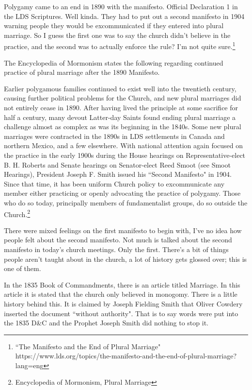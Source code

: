 Polygamy came to an end in 1890 with the manifesto. Official Declaration 1 in the
LDS Scriptures. Well kinda. They had to put out a second manifesto in 1904 warning
people they would be excommunicated if they entered into plural marriage. So I guess
the first one was to say the church didn't believe in the practice, and the second
was to actually enforce the rule? I'm not quite sure.\footnote{
``The Manifesto and the End of Plural Marriage"
https://www.lds.org/topics/the-manifesto-and-the-end-of-plural-marriage?lang=eng
}

The Encyclopedia of Mormonism states the following regarding continued practice of
plural marriage after the 1890 Manifesto.

\begin{displayquote}
Earlier polygamous families continued to exist well into the twentieth century,
causing further political problems for the Church, and new plural marriages did not
entirely cease in 1890. After having lived the principle at some sacrifice for half a
century, many devout Latter-day Saints found ending plural marriage a challenge
almost as complex as was its beginning in the 1840s. Some new plural marriages were
contracted in the 1890s in LDS settlements in Canada and northern Mexico, and a few
elsewhere. With national attention again focused on the practice in the early 1900s
during the House hearings on Representative-elect B. H. Roberts and Senate hearings
on Senator-elect Reed Smoot (see Smoot Hearings), President Joseph F. Smith issued
his ``Second Manifesto" in 1904. Since that time, it has been uniform Church policy 
to excommunicate any member either practicing or openly advocating the practice of
polygamy. Those who do so today, principally members of fundamentalist groups, do so
outside the Church.\footnote{Encyclopedia of Mormonism, Plural Marriage}
\end{displayquote}

There were mixed feelings on the first manifesto to begin with, I've no idea how
people felt about the second manifesto. Not much is talked about the second manifesto
in today's church meetings. Only the first. There's a bit of things people aren't
taught about in the church, a lot of history gets glossed over; this is one of them.

In the 1835 Book of Commandments, there is an article titled Marriage. In this
article it is stated that the church only believed in monogomy. There is a little
history behind this. It is claimed by Joseph Fielding Smith that Oliver Cowdery
inserted the document ``without authority". That is to say words were put into the
1835 D\&C and the Prophet Joseph Smith did nothing to stop it.

